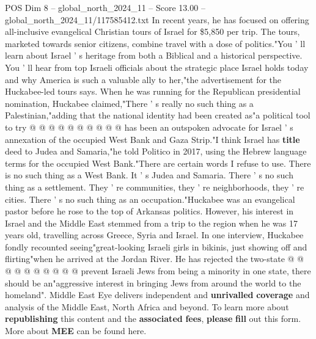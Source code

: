 \begin{textsample}{POS Dim 8 – global\_north\_2024\_11 – Score 13.00 – global\_north\_2024\_11/117585412.txt}
In recent years, he has focused on offering all-inclusive evangelical Christian tours of Israel for \$5,850 per trip.
The tours, marketed towards senior citizens, combine travel with a dose of politics."You ' ll learn about Israel ' s heritage from both a Biblical and a historical perspective.
You ' ll hear from top Israeli officials about the strategic place Israel holds today and why America is such a valuable ally to her,"the advertisement for the Huckabee-led tours says.
When he was running for the Republican presidential nomination, Huckabee claimed,"There ' s really no such thing as a Palestinian,"adding that the national identity had been created as"a political tool to try @ @ @ @ @ @ @ @ @ @ has been an outspoken advocate for Israel ' s annexation of the occupied West Bank and Gaza Strip."I think Israel has \textbf{title} deed to Judea and Samaria,"he told Politico in 2017, using the Hebrew language terms for the occupied West Bank."There are certain words I refuse to use.
There is no such thing as a West Bank.
It ' s Judea and Samaria.
There ' s no such thing as a settlement.
They ' re communities, they ' re neighborhoods, they ' re cities.
There ' s no such thing as an occupation."Huckabee was an evangelical pastor before he rose to the top of Arkansas politics.
However, his interest in Israel and the Middle East stemmed from a trip to the region when he was 17 years old, travelling across Greece, Syria and Israel.
In one interview, Huckabee fondly recounted seeing"great-looking Israeli girls in bikinis, just showing off and flirting"when he arrived at the Jordan River.
He has rejected the two-state @ @ @ @ @ @ @ @ @ @ prevent Israeli Jews from being a minority in one state, there should be an"aggressive interest in bringing Jews from around the world to the homeland".
Middle East Eye delivers independent and \textbf{unrivalled} \textbf{coverage} and analysis of the Middle East, North Africa and beyond.
To learn more about \textbf{republishing} this content and the \textbf{associated} \textbf{fees}, \textbf{please} \textbf{fill} out this form.
More about \textbf{MEE} can be found here.

\end{textsample}
